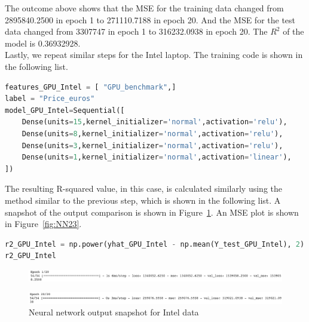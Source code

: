 \documentclass{scrartcl}
\begin{document}
\noindent The outcome above shows that the MSE for the training data changed from 2895840.2500 in epoch 1 to 271110.7188 in epoch 20. And the MSE for the test data changed from 3307747 in epoch 1 to 316232.0938 in epoch 20. The $R^2$ of the model is 0.36932928. \\








\noindent Lastly, we repeat similar steps for the Intel laptop. The training code is shown in the following list. 

\begin{lstlisting}[language=Python, caption= Code for training Intel data, basicstyle=\tiny,captionpos=b]
features_GPU_Intel = [ "GPU_benchmark",]
label = "Price_euros"
model_GPU_Intel=Sequential([
    Dense(units=15,kernel_initializer='normal',activation='relu'),
    Dense(units=8,kernel_initializer='normal',activation='relu'),
    Dense(units=3,kernel_initializer='normal',activation='relu'),
    Dense(units=1,kernel_initializer='normal',activation='linear'),
])
\end{lstlisting}

\noindent The resulting R-squared value, in this case, is calculated similarly using the method similar to the previous step, which is shown in the following list. A snapshot of the output comparison is shown in Figure~\ref{fig:NN24-25}. An MSE plot is shown in Figure~\ref{fig:NN23}. \\

\begin{lstlisting}[language=Python, caption= Code output for MSE Intel training,basicstyle=\tiny,captionpos=b]
r2_GPU_Intel = np.power(yhat_GPU_Intel - np.mean(Y_test_GPU_Intel), 2).sum() / np.power(Y_test_GPU_Intel - np.mean(Y_test_GPU_Intel), 2).sum()
r2_GPU_Intel

\end{lstlisting}

\begin{figure}
         \centering
         \includegraphics[width=\textwidth]{Graphics/Neural Network Images/NN24.png}
\end{figure}
     
\begin{figure}
         \centering
         \includegraphics[width=\textwidth]{Graphics/Neural Network Images/NN25.png}
         \caption{Neural network output snapshot for Intel data}
         \label{fig:NN24-25}
\end{figure}
\end{document}
